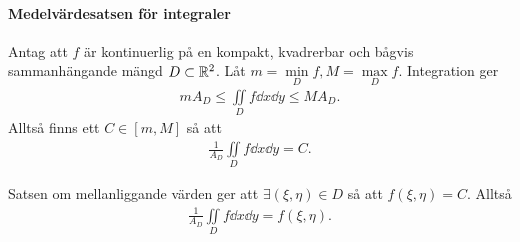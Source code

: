 \paragraph{Medelvärdesatsen för integraler}
Antag att $f$ är kontinuerlig på en kompakt, kvadrerbar och bågvis sammanhängande mängd $D\subset\mathbb{R}^2$. Låt $m = \min\limits_{D}f, M = \max\limits_{D}f$. Integration ger
\begin{align*}
	mA_{D}\leq\iint\limits_{D}f\dd{x}\dd{y}\leq MA_{D}.
\end{align*}
Alltså finns ett $C\in [m, M]$ så att
\begin{align*}
	\frac{1}{A_{D}}\iint\limits_{D}f\dd{x}\dd{y} = C.
\end{align*}

\proof
Satsen om mellanliggande värden ger att $\exists (\xi, \eta)\in D$ så att $f(\xi, \eta) = C$. Alltså
\begin{align*}
	\frac{1}{A_{D}}\iint\limits_{D}f\dd{x}\dd{y} = f(\xi, \eta).
\end{align*}